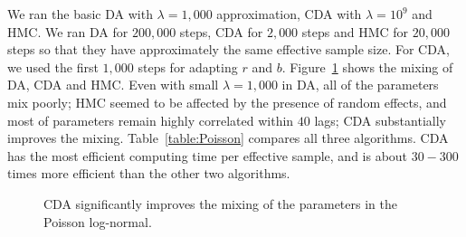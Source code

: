 \documentclass[11pt]{article}
\begin{document}
We ran the basic DA with $\lambda=1,000$ approximation, CDA with $\lambda=10^9$ and HMC. We ran DA for $200,000$ steps, CDA for $2,000$ steps and HMC for $20,000$ steps so that they have approximately the same effective sample size. For CDA, we used the first $1,000$ steps for adapting $r$ and $b$. Figure~\ref{data_poisson} shows the mixing of DA, CDA and HMC. Even with small $\lambda = 1,000$ in DA, all of the parameters mix poorly; HMC seemed to be affected by the presence of random effects, and most of parameters remain highly correlated within $40$ lags; CDA substantially improves the mixing. Table~\ref{table:Poisson} compares all three algorithms. CDA has the most efficient computing time per effective sample, and is about $30-300$ times more efficient than the other two algorithms.

\begin{figure}[H]
  {\caption{CDA significantly improves the mixing of the parameters in the Poisson log-normal. \label{data_poisson}}}
  {%
    \qquad
     \qquad
  }
\end{figure}
 
\end{document}
